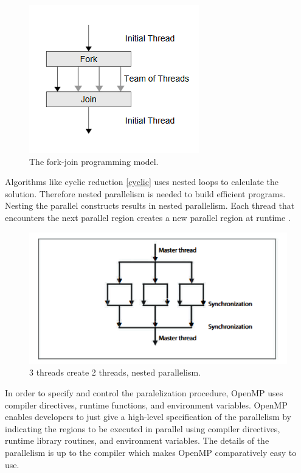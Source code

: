 \documentclass[12pt, oneside]{book}
\theoremstyle{plain}
\theoremstyle{definition}
\begin{document}
\begin{figure}[!htb]
    \centering
        \includegraphics[scale=0.7]{openmp.png}
    \caption{The fork-join programming model.}
\end{figure}

Algorithms like cyclic reduction \ref{cyclic} uses nested loops to calculate the solution. Therefore nested parallelism is needed to build efficient programs. Nesting the parallel constructs results in nested parallelism. Each thread that encounters the next parallel region creates a new parallel region at runtime \cite{openmpnext}.

\begin{figure}[!htb]
    \centering
        \includegraphics[scale=0.7]{openmpnested.png}
    \caption{3 threads create 2 threads, nested parallelism.}
\end{figure}

In order to specify and control the paralelization procedure, OpenMP uses compiler directives, runtime functions, and  envi­ronment variables. OpenMP enables developers to just give a high-level specification of the parallelism by indicating the regions to be executed in parallel using compiler directives, runtime library routines, and environment variables. The details of the parallelism is up to the compiler which makes OpenMP comparatively easy to use. 
\end{document}
